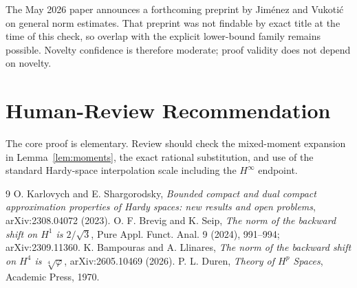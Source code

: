 \documentclass[11pt]{article}
\begin{document}
The May 2026 paper \cite{BL} announces a forthcoming preprint by Jim\'enez and
Vukoti\'c on general norm estimates.  That preprint was not findable by exact
title at the time of this check, so overlap with the explicit lower-bound
family remains possible.  Novelty confidence is therefore moderate; proof
validity does not depend on novelty.

\section*{Human-Review Recommendation}

The core proof is elementary.  Review should check the mixed-moment expansion
in Lemma~\ref{lem:moments}, the exact rational substitution, and use of the
standard Hardy-space interpolation scale including the $H^\infty$ endpoint.

\begin{thebibliography}{9}
 O. Karlovych and E. Shargorodsky,
\emph{Bounded compact and dual compact approximation properties of Hardy
spaces: new results and open problems}, arXiv:2308.04072 (2023).
 O. F. Brevig and K. Seip,
\emph{The norm of the backward shift on $H^1$ is $2/\sqrt3$},
Pure Appl. Funct. Anal. 9 (2024), 991--994; arXiv:2309.11360.
 K. Bampouras and A. Llinares,
\emph{The norm of the backward shift on $H^4$ is $\sqrt[4]{\varphi}$},
arXiv:2605.10469 (2026).
 P. L. Duren, \emph{Theory of $H^p$ Spaces}, Academic Press,
1970.
\end{thebibliography}
\end{document}
